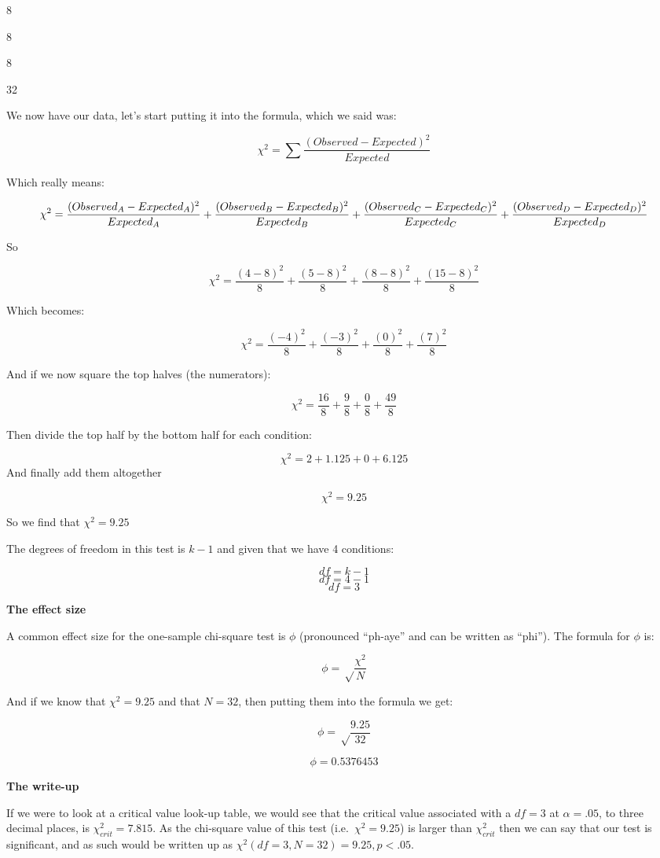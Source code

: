 \documentclass[
  oneside]{book}
\begin{document}
8

8

8

32

We now have our data, let's start putting it into the formula, which we said was:

\[\chi^2 = \sum\frac{(Observed - Expected)^2}{Expected}\]

Which really means:

\[\chi^2 = \frac{(Observed_{A} - Expected_{A})^2}{Expected_{A}} + \frac{(Observed_{B} - Expected_{B})^2}{Expected_{B}} +  \frac{(Observed_{C} - Expected_{C})^2}{Expected_{C}} + \\ \frac{(Observed_{D} - Expected_{D})^2}{Expected_{D}}\]

So

\[\chi^2 = \frac{(4 - 8)^2}{8}+\frac{(5 - 8)^2}{8}+\frac{(8 - 8)^2}{8}+\frac{(15 - 8)^2}{8}\]

Which becomes:

\[\chi^2 = \frac{(-4)^2}{8} + \frac{(-3)^2}{8} + \frac{(0)^2}{8} + \frac{(7)^2}{8}\]

And if we now square the top halves (the numerators):

\[\chi^2 = \frac{16}{8} + \frac{9}{8} + \frac{0}{8} + \frac{49}{8}\]

Then divide the top half by the bottom half for each condition:

\[\chi^2 = {2}+{1.125}+{0}+{6.125}\]
And finally add them altogether

\[\chi^2 = 9.25\]

So we find that \(\chi^2 = 9.25\)

The degrees of freedom in this test is \(k - 1\) and given that we have 4 conditions:

\[df = k - 1\]
\[df = 4 - 1\]
\[df = 3\]

\textbf{The effect size}

A common effect size for the one-sample chi-square test is \(\phi\) (pronounced ``ph-aye'' and can be written as ``phi''). The formula for \(\phi\) is:

\[\phi = \sqrt\frac{\chi^2}{N}\]

And if we know that \(\chi^2 =9.25\) and that \(N = 32\), then putting them into the formula we get:

\[\phi = \sqrt\frac{9.25}{32}\]

\[\phi = 0.5376453\]

\textbf{The write-up}

If we were to look at a critical value look-up table, we would see that the critical value associated with a \(df = 3\) at \(\alpha = .05\), to three decimal places, is \(\chi^2_{crit} = 7.815\). As the chi-square value of this test (i.e.~\(\chi^2 = 9.25\)) is larger than \(\chi^2_{crit}\) then we can say that our test is significant, and as such would be written up as \(\chi^2(df = 3, N = 32) = 9.25,p < .05\).
\end{document}
